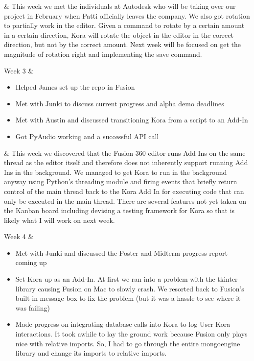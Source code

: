 \documentclass[onecolumn, draftclsnofoot,10pt, compsoc]{IEEEtran}
\begin{document}
\begin{center}
\begin{longtabu}
			&
			{
				This week we met the individuals at Autodesk who will be taking over our project in February when Patti officially leaves the company.
				We also got rotation to partially work in the editor.
				Given a command to rotate by a certain amount in a certain direction, Kora will rotate the object in the editor in the correct direction, but not by the correct amount.
				Next week will be focused on get the magnitude of rotation right and implementing the save command.
			}
			\\ \hline

			Week 3
			&
			{
				\begin{itemize}
					\item Helped James set up the repo in Fusion
					\item Met with Junki to discuss current progress and alpha demo deadlines
					\item Met with Austin and discussed transitioning Kora from a script to an Add-In
					\item Got PyAudio working and a successful API call
				\end{itemize}
			}

			&
			{
				This week we discovered that the Fusion 360 editor runs Add Ins on the same thread as the editor itself and therefore does not inherently support running Add Ins in the background.
				We managed to get Kora to run in the background anyway using Python's threading module and firing events that briefly return control of the main thread back to the Kora Add In for executing code that can only be executed in the main thread.
				There are several features not yet taken on the Kanban board including devising a testing framework for Kora so that is likely what I will work on next week.
			}
			\\ \hline

			Week 4
			&
			{
				\begin{itemize}
					\item Met with Junki and discussed the Poster and Midterm progress report coming up
					\item Set Kora up as an Add-In. At first we ran into a problem with the tkinter library causing Fusion on Mac to slowly crash. We resorted back to Fusion's built in message box to fix the problem (but it was a hassle to see where it was failing)
					\item Made progress on integrating database calls into Kora to log User-Kora interactions. It took awhile to lay the ground work because Fusion only plays nice with relative imports. So, I had to go through the entire mongoengine library and change its imports to relative imports.
				\end{itemize}
			}


\end{longtabu}
\end{center}
\end{document}
